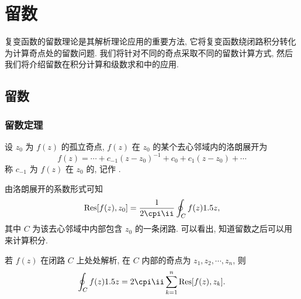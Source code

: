 \chapter{留数}
\label{chapter:5}

复变函数的留数理论是其解析理论应用的重要方法, 它将复变函数绕闭路积分转化为计算奇点处的留数问题.
我们将针对不同的奇点采取不同的留数计算方式, 然后我们将介绍留数在积分计算和级数求和中的应用.



\section{留数}

\subsection{留数定理}

\begin{definition}
  设 $z_0$ 为 $f(z)$ 的孤立奇点, $f(z)$ 在 $z_0$ 的某个去心邻域内的洛朗展开为
  \[
    f(z)=\cdots+c_{-1}(z-z_0)^{-1}+c_0+c_1(z-z_0)+\cdots
  \]
  称 $c_{-1}$ 为 $f(z)$ 在 $z_0$ 的, 记作 \noun{$\Res[f(z),z_0]$}.
\end{definition}

由洛朗展开的系数形式可知
\[
   \Res[f(z),z_0]
  =\frac1{2\cpi\ii}\oint_C f(z)\d z,
\]
其中 $C$ 为该去心邻域中内部包含 $z_0$ 的一条闭路.
可以看出, 知道留数之后可以用来计算积分.

\begin{theorem}
  \label{thm:residue}
  若 $f(z)$ 在闭路 $C$ 上处处解析, 在 $C$ 内部的奇点为 $z_1,z_2,\cdots,z_n$, 则
  \[
     \oint_C f(z)\d z
    =2\cpi\ii\sum_{k=1}^n\Res[f(z),z_k].
  \]
\end{theorem}

